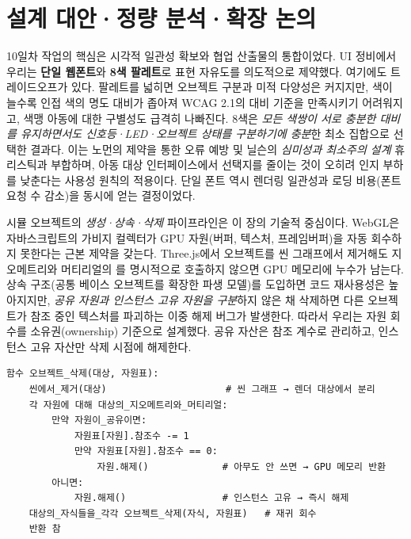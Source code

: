 \section{설계 대안·정량 분석·확장 논의}

10일차 작업의 핵심은 시각적 일관성 확보와 협업 산출물의 통합이었다. UI 정비에서 우리는 \textbf{단일 웹폰트}와 \textbf{8색 팔레트}로 표현 자유도를 의도적으로 제약했다. 여기에도 트레이드오프가 있다. 팔레트를 넓히면 오브젝트 구분과 미적 다양성은 커지지만, 색이 늘수록 인접 색의 명도 대비가 좁아져 WCAG 2.1\cite{wcag21}의 대비 기준을 만족시키기 어려워지고, 색맹 아동에 대한 구별성도 급격히 나빠진다. 8색은 \emph{모든 색쌍이 서로 충분한 대비를 유지하면서도 신호등·LED·오브젝트 상태를 구분하기에 충분}한 최소 집합으로 선택한 결과다. 이는 노먼의 제약을 통한 오류 예방\cite{norman2013design} 및 닐슨의 \emph{심미성과 최소주의 설계} 휴리스틱\cite{nielsen1994heuristics}과 부합하며, 아동 대상 인터페이스에서 선택지를 줄이는 것이 오히려 인지 부하를 낮춘다는 사용성 원칙\cite{krug2014dontmakemethink}의 적용이다. 단일 폰트 역시 렌더링 일관성과 로딩 비용(폰트 요청 수 감소)을 동시에 얻는 결정이었다.

시뮬 오브젝트의 \emph{생성·상속·삭제} 파이프라인은 이 장의 기술적 중심이다. WebGL\cite{webgl}은 자바스크립트의 가비지 컬렉터가 GPU 자원(버퍼, 텍스처, 프레임버퍼)을 자동 회수하지 못한다는 근본 제약을 갖는다. Three.js\cite{threejs}에서 오브젝트를 씬 그래프에서 제거해도 지오메트리와 머티리얼의 를 명시적으로 호출하지 않으면 GPU 메모리에 누수가 남는다. 상속 구조(공통 베이스 오브젝트를 확장한 파생 모델)를 도입하면 코드 재사용성은 높아지지만, \emph{공유 자원과 인스턴스 고유 자원을 구분}하지 않은 채 삭제하면 다른 오브젝트가 참조 중인 텍스처를 파괴하는 이중 해제 버그가 발생한다. 따라서 우리는 자원 회수를 소유권(ownership) 기준으로 설계했다. 공유 자산은 참조 계수로 관리하고, 인스턴스 고유 자산만 삭제 시점에 해제한다.

\begin{verbatim}
함수 오브젝트_삭제(대상, 자원표):
    씬에서_제거(대상)                     # 씬 그래프 → 렌더 대상에서 분리
    각 자원에 대해 대상의_지오메트리와_머티리얼:
        만약 자원이_공유이면:
            자원표[자원].참조수 -= 1
            만약 자원표[자원].참조수 == 0:
                자원.해제()             # 아무도 안 쓰면 → GPU 메모리 반환
        아니면:
            자원.해제()                 # 인스턴스 고유 → 즉시 해제
    대상의_자식들을_각각 오브젝트_삭제(자식, 자원표)   # 재귀 회수
    반환 참
\end{verbatim}

